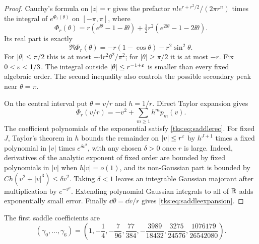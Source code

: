 \begin{proof}
Cauchy's formula on $|z|=r$ gives the prefactor $n!e^{r+r^2/2}/(2\pi r^n)$ times the integral of $e^{\Phi_r(\theta)}$ on $[-\pi,\pi]$, where
\[
\Phi_r(\theta)=r(e^{\ii\theta}-1-\ii\theta)
 +\tfrac12r^2(e^{2\ii\theta}-1-2\ii\theta).
\]
Its real part is exactly
\begin{equation}\label{tks:eq:realphase}
\Re\Phi_r(\theta)=-r(1-\cos\theta)-r^2\sin^2\theta.
\end{equation}
For $|\theta|\leq\pi/2$ this is at most $-4r^2\theta^2/\pi^2$; for $|\theta|\geq\pi/2$ it is at most $-r$. Fix $0<\varepsilon<1/3$. The integral outside $|\theta|\leq r^{-1+\varepsilon}$ is smaller than every fixed algebraic order. The second inequality also controls the possible secondary peak near $\theta=\pi$.

On the central interval put $\theta=v/r$ and $h=1/r$. Direct Taylor expansion gives
\[
\Phi_r(v/r)=-v^2+\sum_{m\geq1}h^mp_m(v).
\]
The coefficient polynomials of the exponential satisfy \eqref{tks:eq:saddlerec}. For fixed $J$, Taylor's theorem in $h$ bounds the remainder on $|v|\leq r^\varepsilon$ by $h^{J+1}$ times a fixed polynomial in $|v|$ times $e^{\delta v^2}$, with any chosen $\delta>0$ once $r$ is large. Indeed, derivatives of the analytic exponent of fixed order are bounded by fixed polynomials in $|v|$ when $h|v|=o(1)$, and its non-Gaussian part is bounded by $Ch(v^2+|v|^3)\leq\delta v^2$. Taking $\delta<1$ leaves an integrable Gaussian majorant after multiplication by $e^{-v^2}$. Extending polynomial Gaussian integrals to all of $\mathbb R$ adds exponentially small error. Finally $\dd\theta=\dd v/r$ gives \eqref{tks:eq:saddleexpansion}.
\end{proof}

The first saddle coefficients are
\begin{equation}\label{tks:eq:gammas}
(\gamma_0,\ldots,\gamma_6)=
\left(1,-\frac14,-\frac7{96},\frac{77}{384},
-\frac{3989}{18432},\frac{3275}{24576},\frac{1076179}{26542080}\right).
\end{equation}


